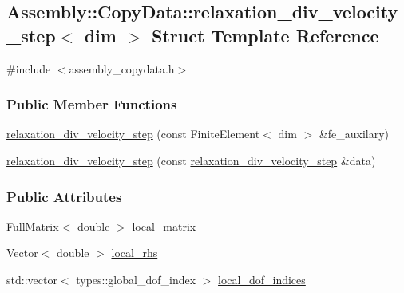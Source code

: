 \hypertarget{struct_assembly_1_1_copy_data_1_1relaxation__div__velocity__step}{}\subsection{Assembly\+:\+:Copy\+Data\+:\+:relaxation\+\_\+div\+\_\+velocity\+\_\+step$<$ dim $>$ Struct Template Reference}
\label{struct_assembly_1_1_copy_data_1_1relaxation__div__velocity__step}


{\ttfamily \#include $<$assembly\+\_\+copydata.\+h$>$}

\subsubsection*{Public Member Functions}
\begin{DoxyCompactItemize}
\item 
\hyperlink{struct_assembly_1_1_copy_data_1_1relaxation__div__velocity__step_ad66012c9981c8465b2a1b6d0a0a128ae}{relaxation\+\_\+div\+\_\+velocity\+\_\+step} (const Finite\+Element$<$ dim $>$ \&fe\+\_\+auxilary)
\item 
\hyperlink{struct_assembly_1_1_copy_data_1_1relaxation__div__velocity__step_aec15ab5c3506b52ca6fcb5d9e4774956}{relaxation\+\_\+div\+\_\+velocity\+\_\+step} (const \hyperlink{struct_assembly_1_1_copy_data_1_1relaxation__div__velocity__step}{relaxation\+\_\+div\+\_\+velocity\+\_\+step} \&data)
\end{DoxyCompactItemize}
\subsubsection*{Public Attributes}
\begin{DoxyCompactItemize}
\item 
Full\+Matrix$<$ double $>$ \hyperlink{struct_assembly_1_1_copy_data_1_1relaxation__div__velocity__step_a9f5b06272cf3ec40da8ad321fefa123f}{local\+\_\+matrix}
\item 
Vector$<$ double $>$ \hyperlink{struct_assembly_1_1_copy_data_1_1relaxation__div__velocity__step_ae75901aacdb5388ace8358c26786fe9c}{local\+\_\+rhs}
\item 
std\+::vector$<$ types\+::global\+\_\+dof\+\_\+index $>$ \hyperlink{struct_assembly_1_1_copy_data_1_1relaxation__div__velocity__step_aa47ca83a0b3c99d4fb949bccbdd2e1cc}{local\+\_\+dof\+\_\+indices}
\end{DoxyCompactItemize}


